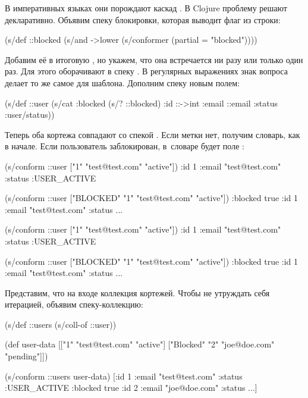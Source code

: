 В императивных языках они порождают каскад . В Clojure проблему
решают декларативно. Объявим спеку блокировки, которая выводит флаг из строки:


\begin{clojure}
(s/def ::blocked
  (s/and
   ->lower
   (s/conformer (partial = "blocked"))))
\end{clojure}



Добавим её в итоговую , но укажем, что она встречается ни разу или
только один раз. Для этого  оборачивают в спеку .  В
регулярных выражениях знак вопроса делает то же самое для шаблона. Дополним
спеку новым полем:


\begin{clojure}
(s/def ::user
  (s/cat :blocked (s/? ::blocked)
         :id ::->int
         :email ::email
         :status :user/status))
\end{clojure}


Теперь оба кортежа совпадают со спекой . Если метки нет, получим
словарь, как в начале. Если пользователь заблокирован, в~словаре будет поле
:

\ifnarrow


\begin{clojure}
(s/conform ::user
  ["1" "test@test.com" "active"])
{:id 1
 :email "test@test.com"
 :status :USER_ACTIVE}

(s/conform ::user
  ["BLOCKED" "1"
   "test@test.com" "active"])
{:blocked true
 :id 1
 :email "test@test.com"
 :status ...}
\end{clojure}


\else


\begin{clojure}
(s/conform ::user ["1" "test@test.com" "active"])
{:id 1 :email "test@test.com" :status :USER_ACTIVE}

(s/conform ::user ["BLOCKED" "1" "test@test.com" "active"])
{:blocked true :id 1 :email "test@test.com" :status ...}
\end{clojure}


\fi

Представим, что на входе коллекция кортежей. Чтобы не утруждать себя итерацией,
объявим спеку-коллекцию:

\ifnarrow


\begin{clojure}
(s/def ::users (s/coll-of ::user))

(def user-data
  [["1" "test@test.com" "active"]
   ["Blocked" "2" "joe@doe.com"
    "pending"]])

(s/conform ::users user-data)
[{:id 1
  :email "test@test.com"
  :status :USER_ACTIVE}
 {:blocked true
  :id 2
  :email "joe@doe.com"
  :status ...}]
\end{clojure}


